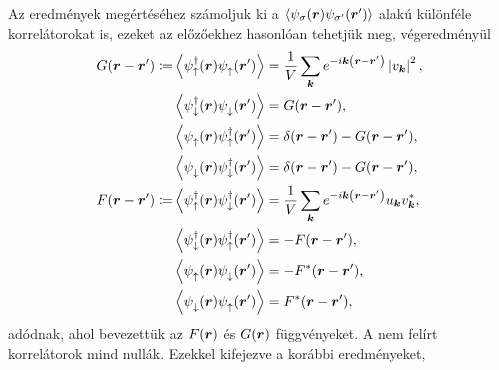 \documentclass[a4paper,12pt,titlepage]{article}
\newcommand{\KK}{{\vb*{k}}}
\newcommand{\RR}{{\vb*{r}}}
\newcommand{\phantomdagger}{{\phantom{\dagger}}}
\begin{document}
Az eredmények megértéséhez számoljuk ki a $\left< \psi_\sigma(\RR) \psi_{\sigma^\prime}(\RR^\prime) \right>$ alakú különféle korrelátorokat is, ezeket az előzőekhez hasonlóan tehetjük meg, végeredményül
\begin{equation}
\begin{split}
	G(\RR - \RR^\prime) \coloneqq & \left< \psi_\uparrow^\dagger(\RR) \psi_\uparrow^\phantomdagger(\RR^\prime) \right> = \frac{1}{V} \sum\limits_\KK e^{-i \KK \left( \RR - \RR^\prime \right)} \left| v_\KK \right|^2, \\
	& \left< \psi_\downarrow^\dagger(\RR) \psi_\downarrow^\phantomdagger(\RR^\prime) \right> = G(\RR - \RR^\prime), \\
	& \left< \psi_\uparrow^\phantomdagger(\RR) \psi_\uparrow^\dagger(\RR^\prime) \right> = \delta(\RR - \RR^\prime) - G(\RR - \RR^\prime), \\
	& \left< \psi_\downarrow^\phantomdagger(\RR) \psi_\downarrow^\dagger(\RR^\prime) \right> = \delta(\RR - \RR^\prime) - G(\RR - \RR^\prime), \\
	F(\RR - \RR^\prime) \coloneqq & \left< \psi_\uparrow^\dagger(\RR) \psi_\downarrow^\dagger(\RR^\prime) \right> = \frac{1}{V} \sum\limits_\KK e^{-i \KK \left( \RR - \RR^\prime \right)} u_\KK v_\KK^*, \\
	& \left< \psi_\downarrow^\dagger(\RR) \psi_\uparrow^\dagger(\RR^\prime) \right> = -F(\RR - \RR^\prime), \\
	& \left< \psi_\uparrow^\phantomdagger(\RR) \psi_\downarrow^\phantomdagger(\RR^\prime) \right> = -F^*(\RR - \RR^\prime), \\
	& \left< \psi_\downarrow^\phantomdagger(\RR) \psi_\uparrow^\phantomdagger(\RR^\prime) \right> = F^*(\RR - \RR^\prime), \\
\end{split}
\end{equation}
adódnak, ahol bevezettük az $F(\RR)$ és $G(\RR)$ függvényeket.  A nem felírt korrelátorok mind nullák.  Ezekkel kifejezve a korábbi eredményeket,
\end{document}
